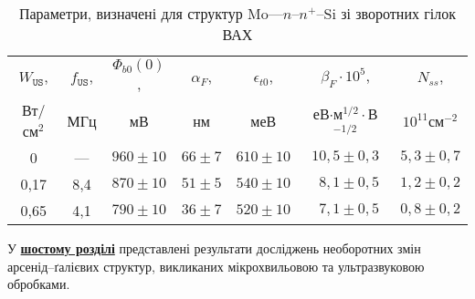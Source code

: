 \begin{table}[hb]
\caption{Параметри, визначені для структур Mo---$n$--$n^+$--Si зі зворотних гілок ВАХ}
\label{tabSDBParZv}
\centering
\begin{tabular}{|c|c|c|c|c|c|c|}
\hline
$W_\mathtt{US}$, &$f_\mathtt{US}$,&$\Phi_{b0}(0)$,&$\alpha_F$,&$\epsilon_{t0}$,&$\beta_F\cdot10^{5}$,&$N_{ss}$,\\
Вт/см$^2$&МГц&мВ&нм&меВ&еВ$\cdot$м$^{1/2}\cdot$В$^{-1/2}$&$10^{11}$см$^{-2}$\\\hline
0&---&$960\pm10$&$66\pm7$&$610\pm10$&$10,5\pm0,3$&$5,3\pm0,7$\\\hline
0,17&8,4&$870\pm10$&$51\pm5$&$540\pm10$&$\;\:8,1\pm0,5$&$1,2\pm0,2$\\\hline
0,65&4,1&$790\pm10$&$36\pm7$&$520\pm10$&$\;\:7,1\pm0,5$&$0,8\pm0,2$\\\hline
\end{tabular}
\end{table}

У  \underline{\textbf{шостому розділі}} представлені результати досліджень необоротних змін арсенід--ґалієвих структур, викликаних мікрохвильовою та ультразвуковою обробками.

